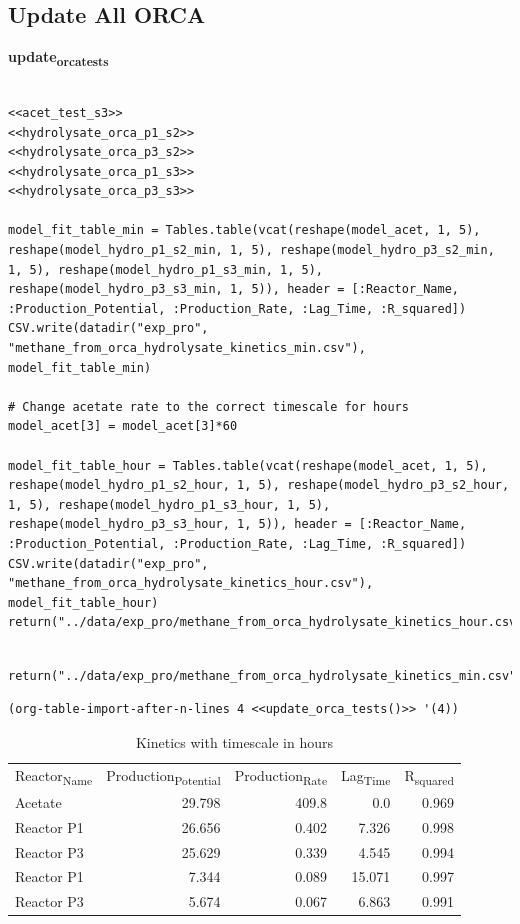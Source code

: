 \documentclass[11pt]{article}
\begin{document}
\subsection{Update All ORCA}
\label{sec:org3518300}
\textbf{update\textsubscript{orca}\textsubscript{tests}}
\begin{verbatim}

<<acet_test_s3>>
<<hydrolysate_orca_p1_s2>>
<<hydrolysate_orca_p3_s2>>
<<hydrolysate_orca_p1_s3>>
<<hydrolysate_orca_p3_s3>>

model_fit_table_min = Tables.table(vcat(reshape(model_acet, 1, 5), reshape(model_hydro_p1_s2_min, 1, 5), reshape(model_hydro_p3_s2_min, 1, 5), reshape(model_hydro_p1_s3_min, 1, 5), reshape(model_hydro_p3_s3_min, 1, 5)), header = [:Reactor_Name, :Production_Potential, :Production_Rate, :Lag_Time, :R_squared])
CSV.write(datadir("exp_pro", "methane_from_orca_hydrolysate_kinetics_min.csv"), model_fit_table_min)

# Change acetate rate to the correct timescale for hours
model_acet[3] = model_acet[3]*60

model_fit_table_hour = Tables.table(vcat(reshape(model_acet, 1, 5), reshape(model_hydro_p1_s2_hour, 1, 5), reshape(model_hydro_p3_s2_hour, 1, 5), reshape(model_hydro_p1_s3_hour, 1, 5), reshape(model_hydro_p3_s3_hour, 1, 5)), header = [:Reactor_Name, :Production_Potential, :Production_Rate, :Lag_Time, :R_squared])
CSV.write(datadir("exp_pro", "methane_from_orca_hydrolysate_kinetics_hour.csv"), model_fit_table_hour)
return("../data/exp_pro/methane_from_orca_hydrolysate_kinetics_hour.csv")
\end{verbatim}

\begin{verbatim}

return("../data/exp_pro/methane_from_orca_hydrolysate_kinetics_min.csv")
\end{verbatim}

\begin{verbatim}
(org-table-import-after-n-lines 4 <<update_orca_tests()>> '(4))
\end{verbatim}

\begin{table}[htbp]
\caption{Kinetics with timescale in hours}
\centering
\begin{tabular}{lrrrr}
Reactor\textsubscript{Name} & Production\textsubscript{Potential} & Production\textsubscript{Rate} & Lag\textsubscript{Time} & R\textsubscript{squared}\\[0pt]
Acetate & 29.798 & 409.8 & 0.0 & 0.969\\[0pt]
Reactor P1 & 26.656 & 0.402 & 7.326 & 0.998\\[0pt]
Reactor P3 & 25.629 & 0.339 & 4.545 & 0.994\\[0pt]
Reactor P1 & 7.344 & 0.089 & 15.071 & 0.997\\[0pt]
Reactor P3 & 5.674 & 0.067 & 6.863 & 0.991\\[0pt]
\end{tabular}
\end{table}
\end{document}

